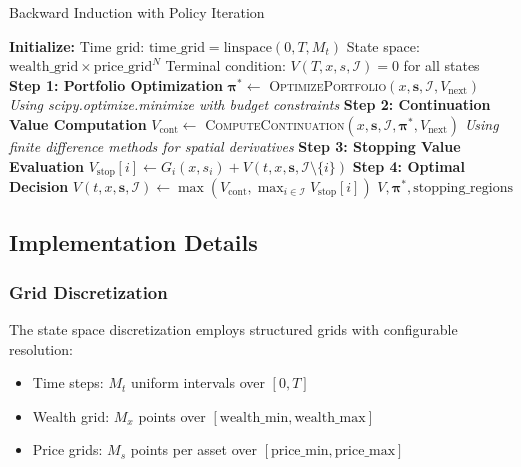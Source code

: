 \documentclass[11pt]{article}
\begin{document}
\begin{algorithm}[H]
\caption{Backward Induction with Policy Iteration}
\label{alg:backward_induction}
\begin{algorithmic}[1]
\STATE \textbf{Initialize:}
\STATE \quad Time grid: $\text{time\_grid} = \text{linspace}(0, T, M_t)$
\STATE \quad State space: $\text{wealth\_grid} \times \text{price\_grid}^N$
\STATE \quad Terminal condition: $V(T, x, s, \mathcal{I}) = 0$ for all states
\STATE
{}
            \STATE
            \STATE \textbf{Step 1: Portfolio Optimization}
            \STATE $\boldsymbol{\pi}^* \leftarrow$ \textsc{OptimizePortfolio}$(x, \mathbf{s}, \mathcal{I}, V_{\text{next}})$
            \STATE \quad \textit{Using scipy.optimize.minimize with budget constraints}
            \STATE
            \STATE \textbf{Step 2: Continuation Value Computation}
            \STATE $V_{\text{cont}} \leftarrow$ \textsc{ComputeContinuation}$(x, \mathbf{s}, \mathcal{I}, \boldsymbol{\pi}^*, V_{\text{next}})$
            \STATE \quad \textit{Using finite difference methods for spatial derivatives}
            \STATE
            \STATE \textbf{Step 3: Stopping Value Evaluation}
                \STATE $V_{\text{stop}}[i] \leftarrow G_i(x, s_i) + V(t, x, \mathbf{s}, \mathcal{I}\setminus\{i\})$
            \ENDFOR
            \STATE
            \STATE \textbf{Step 4: Optimal Decision}
            \STATE $V(t, x, \mathbf{s}, \mathcal{I}) \leftarrow \max(V_{\text{cont}}, \max_{i\in\mathcal{I}} V_{\text{stop}}[i])$
        \ENDFOR
    \ENDFOR
\ENDFOR
\RETURN $V, \boldsymbol{\pi}^*, \text{stopping\_regions}$
\end{algorithmic}
\end{algorithm}

\subsection{Implementation Details}

\subsubsection{Grid Discretization}
The state space discretization employs structured grids with configurable resolution:
\begin{itemize}
\item Time steps: $M_t$ uniform intervals over $[0, T]$
\item Wealth grid: $M_x$ points over $[\text{wealth\_min}, \text{wealth\_max}]$
\item Price grids: $M_s$ points per asset over $[\text{price\_min}, \text{price\_max}]$
\end{itemize}
\end{document}
